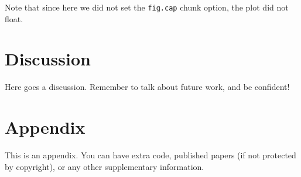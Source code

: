 \documentclass[
  12pt,
  oneside]{book}
\begin{document}
Note that since here we did not set the \texttt{fig.cap} chunk option, the plot did not float.

\hypertarget{discussion}{%
\chapter{Discussion}\label{discussion}}

Here goes a discussion.
Remember to talk about future work, and be confident!

\hypertarget{appendix-appendix}{%
\appendix}


\hypertarget{a-appendix}{%
\chapter{Appendix}\label{a-appendix}}

This is an appendix.
You can have extra code, published papers (if not protected by copyright), or any other supplementary information.

  
\end{document}

